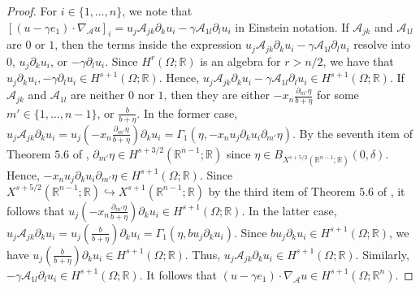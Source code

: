 \documentclass[11pt,letterpaper,reqno]{amsart}
\numberwithin{equation}{section}
\begin{document}
\begin{proof}
    For \(i \in \{1, \dots, n\}\), we note that \([(u-\gamma e_{1})\cdot \nabla_{\mathcal{A}}u]_{i}=u_{j}\mathcal{A}_{jk}\partial_{k}u_{i}-\gamma \mathcal{A}_{1l}\partial_{l}u_{i}\) in Einstein notation. If \(\mathcal{A}_{jk}\) and \(\mathcal{A}_{1l}\) are \(0\) or \(1\), then the terms inside the expression \(u_{j}\mathcal{A}_{jk}\partial_{k}u_{i}-\gamma \mathcal{A}_{1l}\partial_{l}u_{i}\) resolve into \(0\), \(u_{j}\partial_{k}u_{i}\), or \(-\gamma\partial_{l}u_{i}\). Since \(H^{r}(\Omega;\mathbb{R})\) is an algebra for \(r > n/2\), we have that \(u_{j}\partial_{k}u_{i}, -\gamma\partial_{l}u_{i} \in H^{s+1}(\Omega;\mathbb{R})\). Hence, \(u_{j}\mathcal{A}_{jk}\partial_{k}u_{i}-\gamma \mathcal{A}_{1l}\partial_{l}u_{i} \in H^{s+1}(\Omega;\mathbb{R})\). If \(\mathcal{A}_{jk}\) and \(\mathcal{A}_{1l}\) are neither \(0\) nor \(1\), then they are either \(-x_{n}\frac{\partial_{m'}\eta}{b+\eta}\) for some \(m' \in \{1, \dots, n-1\}\), or \(\frac{b}{b+\eta}\). In the former case, \(u_{j}\mathcal{A}_{jk}\partial_{k}u_{i}=u_{j}(-x_{n}\frac{\partial_{m'}\eta}{b+\eta})\partial_{k}u_{i}=\Gamma_{1}(\eta,-x_{n}u_{j}\partial_{k}u_{i}\partial_{m'}\eta)\). By the seventh item of Theorem \(5.6\) of \cite{leoni2023traveling}, \(\partial_{m'} \eta \in H^{s+3/2}(\mathbb{R}^{n-1};\mathbb{R})\) since \(\eta \in B_{X^{s+5/2}(\mathbb{R}^{n-1};\mathbb{R})}(0,\delta)\). Hence, \(-x_{n}u_{j}\partial_{k}u_{i}\partial_{m'}\eta \in H^{s+1}(\Omega;\mathbb{R})\). Since \(X^{s+5/2}(\mathbb{R}^{n-1};\mathbb{R}) \hookrightarrow X^{s+1}(\mathbb{R}^{n-1};\mathbb{R})\) by the third item of Theorem \(5.6\) of \cite{leoni2023traveling}, it follows that \(u_{j}(-x_{n}\frac{\partial_{m'}\eta}{b+\eta})\partial_{k}u_{i} \in H^{s+1}(\Omega;\mathbb{R})\). In the latter case, \(u_{j}\mathcal{A}_{jk}\partial_{k}u_{i}=u_{j}(\frac{b}{b+\eta})\partial_{k}u_{i}=\Gamma_{1}(\eta,bu_{j}\partial_{k}u_{i})\). Since \(b u_{j}\partial_{k}u_{i} \in H^{s+1}(\Omega;\mathbb{R})\), we have \(u_{j}(\frac{b}{b+\eta})\partial_{k}u_{i} \in H^{s+1}(\Omega;\mathbb{R})\). Thus, \(u_{j}\mathcal{A}_{jk}\partial_{k}u_{i} \in H^{s+1}(\Omega;\mathbb{R})\). Similarly, \(-\gamma \mathcal{A}_{1l}\partial_{l}u_{i} \in H^{s+1}(\Omega;\mathbb{R})\). It follows that \((u-\gamma e_{1})\cdot \nabla_{\mathcal{A}}u \in H^{s+1}(\Omega;\mathbb{R}^{n})\).
    

\end{proof}
\end{document}
